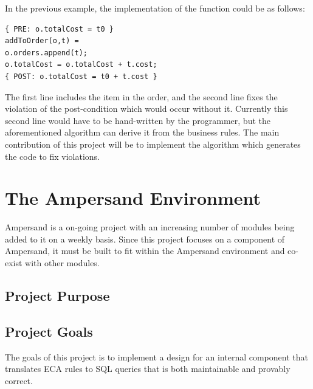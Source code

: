 \documentclass[12pt]{report}
\begin{document}
In the previous example, the implementation of the
function could be as follows: 

\begin{verbatim}
{ PRE: o.totalCost = t0 } 
addToOrder(o,t) = 
o.orders.append(t);
o.totalCost = o.totalCost + t.cost;
{ POST: o.totalCost = t0 + t.cost } 
\end{verbatim}
The first line includes the item in the order, and the second line fixes the
violation of the post-condition which would occur without it. Currently this
second line would have to be hand-written by the programmer, but the
aforementioned
 algorithm can derive it from the business rules. The main
contribution of this project will be to implement the algorithm which generates
the code to fix violations.

{\section{The Ampersand Environment}\label{sec:Purpose}}
Ampersand is a on-going project with an increasing number of modules being
added to it on a weekly basis. 
Since this project focuses on a component of 
Ampersand, it must be built to fit within the Ampersand environment and 
co-exist with other modules.
\subsection{Project Purpose}

\subsection{Project Goals} 
The goals of this project is to implement a design for an internal component 
that translates ECA rules to SQL queries that is both maintainable and provably 
correct.
\end{document}
